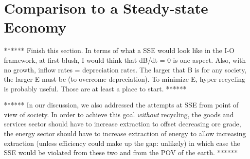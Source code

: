 \section{Comparison to a Steady-state Economy}

****** Finish this section. 
In terms of what a SSE would look like in the I-O framework, 
at first blush, I would think that dB/dt = 0 is one aspect.  
Also, with no growth, inflow rates = depreciation rates.  
The larger that B is for any society, the larger E must be (to overcome depreciation).  
To minimize E, hyper-recycling is probably useful.  
Those are at least a place to start. ******

****** In our discussion, 
we also addressed the attempts at SSE from point of view of society. 
In order to achieve this goal \emph{without} recycling, 
the goods and services sector should have to increase extraction to offset decreasing ore grade, 
the energy sector should have to increase extraction of energy 
to allow increasing extraction (unless efficiency could make up the gap: unlikely) 
in which case the SSE would be violated from these two and from the POV of the earth.
******








%
%

